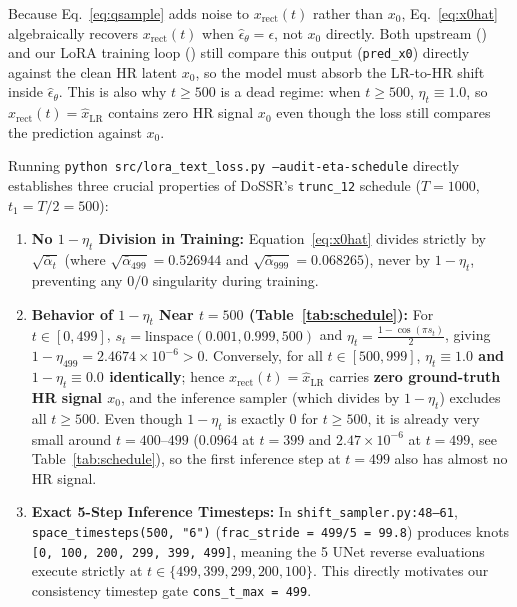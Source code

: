 \documentclass[11pt]{article}
\begin{document}
Because Eq.~\eqref{eq:qsample} adds noise to $x_{\text{rect}}(t)$ rather than $x_0$, Eq.~\eqref{eq:x0hat} algebraically recovers $x_{\text{rect}}(t)$ when $\hat{\epsilon}_\theta = \epsilon$, not $x_0$ directly. Both upstream  () and our LoRA training loop () still compare this output (\texttt{pred\_x0}) directly against the clean HR latent $x_0$, so the model must absorb the LR-to-HR shift inside $\hat{\epsilon}_\theta$. This is also why $t \ge 500$ is a dead regime: when $t \ge 500$, $\eta_t \equiv 1.0$, so $x_{\text{rect}}(t) = \hat{x}_{\text{LR}}$ contains zero HR signal $x_0$ even though the loss still compares the prediction against $x_0$.

Running \texttt{python src/lora\_text\_loss.py --audit-eta-schedule} directly establishes three crucial properties of DoSSR's \texttt{trunc\_12} schedule ($T=1000$, $t_1 = T/2 = 500$):
\begin{enumerate}
    \item \textbf{No $1 - \eta_t$ Division in Training:} Equation~\eqref{eq:x0hat} divides strictly by $\sqrt{\bar{\alpha}_t}$ (where $\sqrt{\bar{\alpha}_{499}} = 0.526944$ and $\sqrt{\bar{\alpha}_{999}} = 0.068265$), never by $1-\eta_t$, preventing any $0/0$ singularity during training.
    \item \textbf{Behavior of $1 - \eta_t$ Near $t=500$ (Table~\ref{tab:schedule}):} For $t \in [0, 499]$, $s_t = \text{linspace}(0.001, 0.999, 500)$ and $\eta_t = \frac{1 - \cos(\pi s_t)}{2}$, giving $1 - \eta_{499} = 2.4674 \times 10^{-6} > 0$. Conversely, for all $t \in [500, 999]$, \textbf{$\eta_t \equiv 1.0$ and $1 - \eta_t \equiv 0.0$ identically}; hence $x_{\text{rect}}(t) = \hat{x}_{\text{LR}}$ carries \textbf{zero ground-truth HR signal $x_0$}, and the inference sampler (which divides by $1-\eta_t$) excludes all $t \ge 500$. Even though $1 - \eta_t$ is exactly $0$ for $t \ge 500$, it is already very small around $t = 400$--$499$ ($0.0964$ at $t=399$ and $2.47\times 10^{-6}$ at $t=499$, see Table~\ref{tab:schedule}), so the first inference step at $t=499$ also has almost no HR signal.
    \item \textbf{Exact 5-Step Inference Timesteps:} In \texttt{shift\_sampler.py:48--61}, \texttt{space\_timesteps(500, "6")} (\texttt{frac\_stride = 499/5 = 99.8}) produces knots \texttt{[0, 100, 200, 299, 399, 499]}, meaning the 5 UNet reverse evaluations execute strictly at $t \in \{499, 399, 299, 200, 100\}$. This directly motivates our consistency timestep gate \texttt{cons\_t\_max = 499}.
\end{enumerate}
\end{document}
